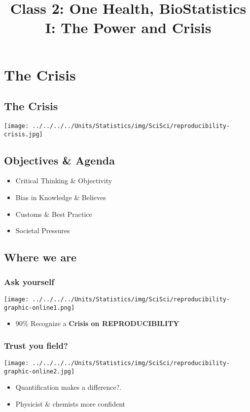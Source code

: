 \documentclass[10pt,article]{article}
\date{\vspace{-6ex}}
\title{Class 2: One Health, BioStatistics I: The Power and Crisis}
\begin{document}
\maketitle
\section{The Crisis}
\label{sec:org1fd762d}
\subsection{The Crisis}
\label{Crisis}
\begin{center}
\texttt{[image: ../../../../Units/Statistics/img/SciSci/reproducibility-crisis.jpg]}
\end{center}

\subsection{Objectives \& Agenda}
\label{ObjAgendaCrisis}
\begin{itemize}
\item Critical Thinking \& Objectivity
\item Bias in Knowledge \& Believes
\item Customs \& Best Practice
\item Societal Pressures
\end{itemize}

\subsection{Where we are}
\label{sec:org5678182}
\subsubsection{Ask yourself}
\label{sec:orgb0a3c4f}
\begin{center}
\texttt{[image: ../../../../Units/Statistics/img/SciSci/reproducibility-graphic-online1.png]}
\end{center}
\begin{itemize}
\item 90\% Recognize a \textbf{Crisis on REPRODUCIBILITY}
\end{itemize}

\subsubsection{Trust you field?}
\label{sec:orgd8e0718}
\begin{center}
\texttt{[image: ../../../../Units/Statistics/img/SciSci/reproducibility-graphic-online2.jpg]}
\end{center}
\begin{itemize}
\item Quantification makes a difference?.
\item Physicist \& chemists more confident
\end{itemize}
\end{document}
